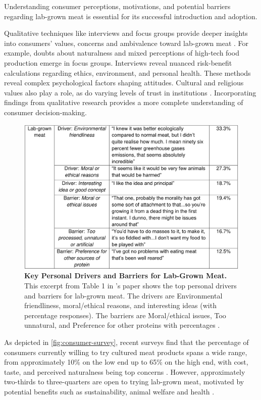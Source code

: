 \documentclass[10pt]{article}
\begin{document}
\begin{sloppypar}
  Understanding consumer perceptions, motivations, and potential barriers regarding lab-grown meat is essential for its successful introduction and adoption.

  Qualitative techniques like interviews and focus groups provide deeper insights into consumers’ values, concerns and ambivalence toward lab-grown meat \citep{laestadius_is_2015}. For example, doubts about naturalness and mixed perceptions of high-tech food production emerge in focus groups. Interviews reveal nuanced risk-benefit calculations regarding ethics, environment, and personal health. These methods reveal complex psychological factors shaping attitudes. Cultural and religious values also play a role, as do varying levels of trust in institutions \citep{al-kwifi_dynamics_2019}. Incorporating findings from qualitative research provides a more complete understanding of consumer decision-making.

  \begin{figure}[ht]
    \centering
    \includegraphics[width=\textwidth]{figures/excerpt-lab-grown-meat.png}
    \caption[Key Personal Drivers and Barriers for Lab-Grown Meat.]{\textbf{Key Personal Drivers and Barriers for Lab-Grown Meat.} This excerpt from Table 1 in \citeauthor{circus_exploring_2018} ’s paper shows the top personal drivers and barriers for lab-grown meat. The drivers are Environmental friendliness, moral/ethical reasons, and interesting ideas (with percentage responses). The barriers are Moral/ethical issues, Too unnatural, and Preference for other proteins with percentages \citep{circus_exploring_2018}.}
    \label{fig:consumer-survey}
  \end{figure}

  As depicted in \autoref{fig:consumer-survey}, recent surveys find that the percentage of consumers currently willing to try cultured meat products spans a wide range, from approximately 10\% on the low end up to 65\% on the high end, with cost, taste, and perceived naturalness being top concerns \citep{bryant_consumer_2018}. However, approximately two-thirds to three-quarters are open to trying lab-grown meat, motivated by potential benefits such as sustainability, animal welfare and health \citep{wilks_attitudes_2017}.


\end{sloppypar}
\end{document}
